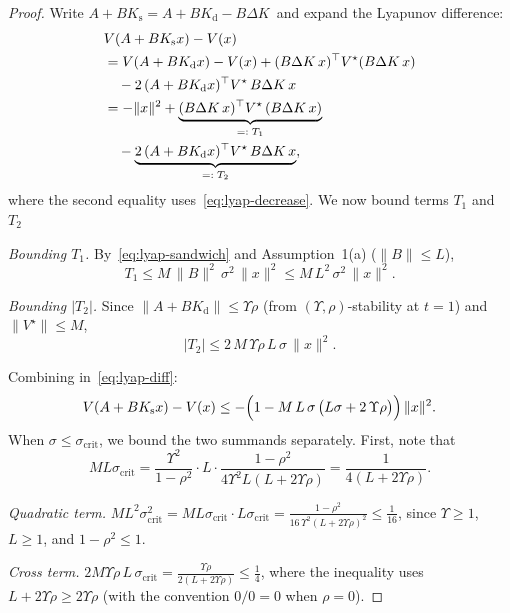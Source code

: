 \documentclass[conference]{IEEEtran}
\begin{document}
\begin{proof}
Write $A+BK_{\mathrm{s}} = A+BK_{\mathrm{d}} - B\Delta K\,$
and expand the Lyapunov difference:
\begin{align}
  &V(A+BK_{\mathrm{s}} x) - V(x)
  \notag \\
  &= V(A+BK_{\mathrm{d}} x) - V(x)
     + (B\Delta K\,x)^{\top} V^{\star} (B\Delta K\,x)
  \notag \\
  &\quad - 2\,(A+BK_{\mathrm{d}} x)^{\top} V^{\star}\, B\Delta K\, x
  \notag \\
  &= -\|x\|^{2}
     + \underbrace{(B\Delta K\,x)^{\top} V^{\star}\,(B\Delta K\,x)}
       _{=:\; T_{1}}
  \notag \\
  &\quad
     - \underbrace{2\,(A+BK_{\mathrm{d}} x)^{\top}
       V^{\star}\, B\Delta K\, x}_{=:\; T_{2}},
  \label{eq:lyap-diff}
\end{align}
where the second equality uses~\eqref{eq:lyap-decrease}. We now bound terms $T_1$ and $T_2$


\emph{Bounding $T_1$.}
By~\eqref{eq:lyap-sandwich} and Assumption~1(a)
($\|B\| \le L$),
\[
  T_{1} \le M\,\|B\|^{2}\,\sigma^{2}\,\|x\|^{2}
       \le M\, L^{2}\,\sigma^{2}\,\|x\|^{2}.
\]

\emph{Bounding $|T_2|$.}
Since $\|A+BK_{\mathrm{d}}\| \le \Upsilon\rho$
(from $(\Upsilon,\rho)$-stability at $t=1$) and
$\|V^{\star}\| \le M$,
\[
  |T_{2}| \le 2\,M\,\Upsilon\rho\,L\,\sigma\,\|x\|^{2}.
\]

Combining in~\eqref{eq:lyap-diff}:
\begin{equation}\label{eq:lyap-diff-bound}
  V(A+BK_{\mathrm{s}} x) - V(x)
  \le -\Bigl(1 - M\,L\,\sigma\,
       \bigl(L\sigma + 2\,\Upsilon\rho\bigr)\Bigr)\,\|x\|^{2}.
\end{equation}
When $\sigma \le \sigma_{\mathrm{crit}}$, we bound the two
summands separately.  First, note that
\[
  M L \sigma_{\mathrm{crit}}
  = \frac{\Upsilon^{2}}{1-\rho^{2}} \cdot L \cdot
    \frac{1-\rho^{2}}{4\Upsilon^{2} L(L+2\Upsilon\rho)}
  = \frac{1}{4(L+2\Upsilon\rho)}.
\]

\emph{Quadratic term.}
$M L^{2} \sigma_{\mathrm{crit}}^{2}
  = M L \sigma_{\mathrm{crit}} \cdot L\sigma_{\mathrm{crit}}
  = \frac{1-\rho^{2}}
         {16\,\Upsilon^{2}(L + 2\Upsilon\rho)^{2}}
  \le \frac{1}{16}$,
since $\Upsilon \ge 1$, $L \ge 1$, and $1-\rho^{2} \le 1$.

\emph{Cross term.}
$2 M \Upsilon\rho\, L\, \sigma_{\mathrm{crit}}
  = \frac{\Upsilon\rho}{2(L + 2\Upsilon\rho)}
  \le \frac{1}{4}$,
where the inequality uses $L + 2\Upsilon\rho \ge 2\Upsilon\rho$
(with the convention $0/0 = 0$ when $\rho = 0$).


\end{proof}
\end{document}
